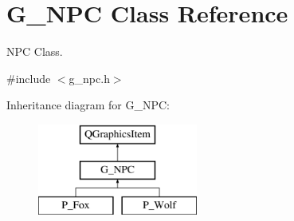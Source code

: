 \hypertarget{class_g___n_p_c}{}\section{G\+\_\+\+N\+P\+C Class Reference}
\label{class_g___n_p_c}


N\+P\+C Class.  




{\ttfamily \#include $<$g\+\_\+npc.\+h$>$}

Inheritance diagram for G\+\_\+\+N\+P\+C\+:\begin{figure}[H]
\begin{center}
\leavevmode
\includegraphics[height=3.000000cm]{class_g___n_p_c}
\end{center}
\end{figure}
